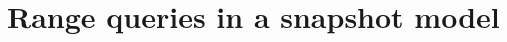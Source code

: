 \chapter{Range queries in a snapshot model}\label{section:range-queries-snapshot}
\thispagestyle{myheadings}
